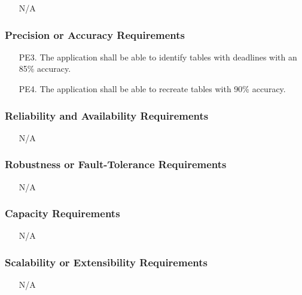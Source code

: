 \documentclass[12pt, titlepage]{article}
\begin{document}
\begin{itemize}
  \item[] N/A
\end{itemize}

\subsubsection{ Precision or Accuracy Requirements}

\begin{itemize}
  \item[PE3.] The application shall be able to identify tables with deadlines with an 85\% accuracy.
  \item[PE4.] The application shall be able to recreate tables with 90\% accuracy.
\end{itemize}

\subsubsection{ Reliability and Availability Requirements }

\begin{itemize}
  \item[] N/A
\end{itemize}

\subsubsection{ Robustness or Fault-Tolerance Requirements}

\begin{itemize}
  \item[] N/A
\end{itemize}

\subsubsection{ Capacity Requirements}

\begin{itemize}
  \item[] N/A
\end{itemize}

\subsubsection{ Scalability or Extensibility Requirements}

\begin{itemize}
  \item[] N/A
\end{itemize}
\end{document}
